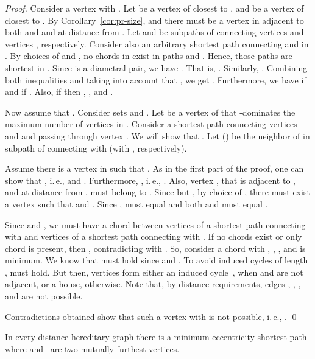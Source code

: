 \documentclass[10pt]{llncs}
\makeatletter
\newcommand{\ie}{i.\,e.\@ifnextchar{,}{}{~}}
\makeatother
\begin{document}
\begin{proof} 
Consider a vertex  with . 
Let  be a vertex of  closest to , and  be a vertex of  closest to . 
By Corollary~\ref{cor:pr-size},  and there must be a vertex  in  adjacent to both  and  and at distance  from . 
Let  and  be subpaths of  connecting vertices  and vertices , respectively. 
Consider also an arbitrary shortest path  connecting  and  in . 
By choices of  and , no chords in  exist in paths  and . 
Hence, those paths are shortest in . 
Since  is a diametral pair, we have . 
That is, .
Similarly, . 
Combining both inequalities and taking into account that , we get  . 
Furthermore, we have  if  and  if .
Also, if  then , ,  and .

Now assume that . 
Consider sets  and . 
Let  be a vertex of  that -dominates the maximum number of vertices in . 
Consider a shortest path  connecting vertices  and  and passing through vertex . 
We will show that . 
Let  () be the neighbor of  in subpath of  connecting  with  (with , respectively).

Assume there is a vertex  in  such that . 
As in the first part of the proof, one can show that , \ie,  and . 
Furthermore, , \ie, . 
Also, vertex , that is adjacent to ,  and at distance  from , must belong to . 
Since  but , by choice of , there must exist a vertex  such that  and . 
Since ,  must equal  and both  and  must equal .  

Since  and , we must have a chord between vertices of a shortest path  connecting  with  and vertices of a shortest path  connecting  with . 
If no chords exist or only chord  is present, then , contradicting with . 
So, consider a chord  with , , , and  is minimum. 
We know that  must hold since  and .
To avoid induced cycles of length ,  must hold.
But then, vertices  form either an induced cycle~, when  and  are not adjacent, or a house, otherwise.
Note that, by distance requirements, edges , , , and  are not possible. 

Contradictions obtained show that such a vertex  with  is not possible, \ie, . 
\qed
\end{proof}

\begin{lemma}
    \label{lm:mf} 
In every distance-hereditary graph there is a minimum eccentricity shortest path  where  and~ are two mutually furthest vertices. 
\end{lemma}
\end{document}
